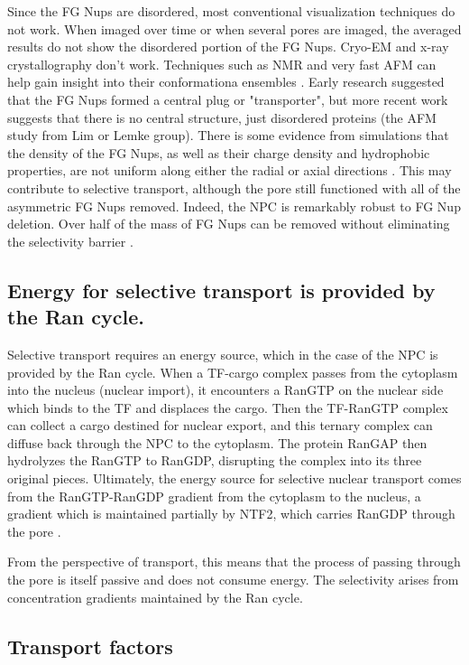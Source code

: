 Since the FG Nups are disordered, most conventional visualization techniques do not work.  When imaged over time or when several pores are imaged, the averaged results do not show the disordered portion of the FG Nups.  Cryo-EM and x-ray crystallography don't work.  Techniques such as NMR and very fast AFM can help gain insight into their conformationa ensembles \cite{Loren's papers, the AFM paper}.  Early research suggested that the FG Nups formed a central plug or "transporter", but more recent work suggests that there is no central structure, just disordered proteins (the AFM study from Lim or Lemke group). There is some evidence from simulations that the density of the FG Nups, as well as their charge density and hydrophobic properties, are not uniform along either the radial or axial directions \cite{some energy landscape things, some simulations}.  This may contribute to selective transport, although the pore still functioned with all of the asymmetric FG Nups removed.  Indeed, the NPC is remarkably robust to FG Nup deletion.  Over half of the mass of FG Nups can be removed without eliminating the selectivity barrier \cite{beck17}.

\subsection{Energy for selective transport is provided by the Ran cycle.}
Selective transport requires an energy source, which in the case of the NPC is provided by the Ran cycle.  When a TF-cargo complex passes from the cytoplasm into the nucleus (nuclear import), it encounters a RanGTP on the nuclear side which binds to the TF and displaces the cargo.  Then the TF-RanGTP complex can collect a cargo destined for nuclear export, and this ternary complex can diffuse back through the NPC to the cytoplasm.  The protein RanGAP then hydrolyzes the RanGTP to RanGDP, disrupting the complex into its three original pieces.  Ultimately, the energy source for selective nuclear transport comes from the RanGTP-RanGDP gradient from the cytoplasm to the nucleus, a gradient which is maintained partially by NTF2, which carries RanGDP through the pore \cite{stanley17}.

From the perspective of transport, this means that the process of passing through the pore is itself passive and does not consume energy.  The selectivity arises from concentration gradients maintained by the Ran cycle.

\subsection{Transport factors}

